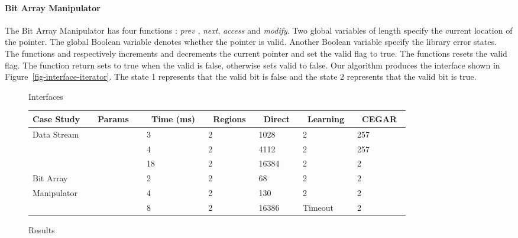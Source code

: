 \documentclass{llncs}
\begin{document}
\paragraph{Bit Array Manipulator} The Bit Array Manipulator has four functions : {\em prev} , {\em next},
{\em access} and {\em modify}.
Two global variables  of length  specify the current location of the pointer.
The global Boolean variable  denotes whether the pointer is valid.  
Another Boolean variable  specify the library error states.  
The functions  and  respectively increments and decrements the current pointer  and set the valid flag to true.
The functions  resets the valid flag. The function  return sets  to true when the valid is false, otherwise sets valid to false. 
Our algorithm produces the interface shown in Figure~\ref{fig-interface-iterator}.
The state 1 represents that the valid bit is false and the state 2 represents that the valid bit is true.
\begin{figure}[t]
\begin{center}
\caption{Interfaces}
\end{center}
\end{figure}





\begin{figure}[htb]
\begin{tabular}{| l | l| l l |l l l|}
\hline
Case Study\ & \ Params\ \ &\  Time (ms)\ &\ Regions\ &\ Direct\ &\ Learning\ &\ CEGAR\ \\
\hline
Data Stream &  &  3  & 2 & 1028 & 2 & 257\\
                              &  &  4  & 2 & 4112 & 2 & 257\\
                              &  &  18 & 2 & 16384 & 2 & 2\\ 
\hline 
Bit Array           &    & 2 &  2 & 68 & 2 & 2\\
Manipulator     &     & 4  &   2 & 130 & 2 & 2\\
                           &     & 8  &   2 & 16386 & Timeout & 2\\
\hline 
\end{tabular}
\label{results}
\caption{Results}\label{tab-res}
\end{figure}
\end{document}
